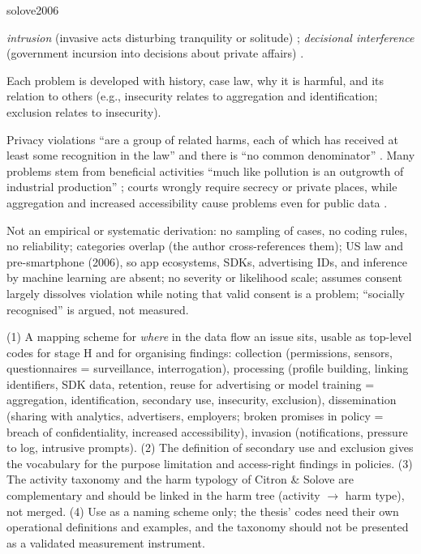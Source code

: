 \begin{papercard}{solove2006}
\begin{description}[nosep,leftmargin=1.2em,labelindent=0pt]
\item[D. Invasion] \emph{intrusion} (invasive acts disturbing tranquility or solitude) ; \emph{decisional interference} (government incursion into decisions about private affairs) .
\end{description}
Each problem is developed with history, case law, why it is harmful, and its relation to others (e.g., insecurity relates to aggregation and identification; exclusion relates to insecurity).

 Privacy violations ``are a group of related harms, each of which has received at least some recognition in the law'' and there is ``no common denominator'' . Many problems stem from beneficial activities ``much like pollution is an outgrowth of industrial production'' ; courts wrongly require secrecy or private places, while aggregation and increased accessibility cause problems even for public data .

 Not an empirical or systematic derivation: no sampling of cases, no coding rules, no reliability; categories overlap (the author cross-references them); US law and pre-smartphone (2006), so app ecosystems, SDKs, advertising IDs, and inference by machine learning are absent; no severity or likelihood scale; assumes consent largely dissolves violation while noting that valid consent is a problem; ``socially recognised'' is argued, not measured.

 (1) A mapping scheme for \emph{where} in the data flow an issue sits, usable as top-level codes for stage H and for organising findings: collection (permissions, sensors, questionnaires = surveillance, interrogation), processing (profile building, linking identifiers, SDK data, retention, reuse for advertising or model training = aggregation, identification, secondary use, insecurity, exclusion), dissemination (sharing with analytics, advertisers, employers; broken promises in policy = breach of confidentiality, increased accessibility), invasion (notifications, pressure to log, intrusive prompts). (2) The definition of secondary use and exclusion gives the vocabulary for the purpose limitation and access-right findings in policies. (3) The activity taxonomy and the harm typology of Citron \& Solove are complementary and should be linked in the harm tree (activity $\to$ harm type), not merged. (4) Use as a naming scheme only; the thesis' codes need their own operational definitions and examples, and the taxonomy should not be presented as a validated measurement instrument.
\end{papercard}
